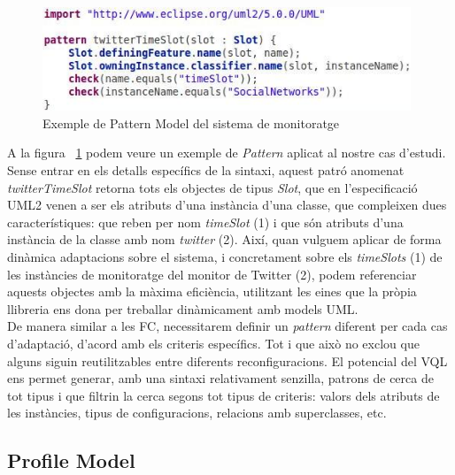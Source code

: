 \begin{figure}
\centering
\includegraphics[width=11cm]{Figures/Figure19}
\decoRule
\caption{Exemple de Pattern Model del sistema de monitoratge}
\label{fig:Figura19}
\end{figure}

A la figura ~\ref{fig:Figura19} podem veure un exemple de \textit{Pattern} aplicat al nostre cas d'estudi. Sense entrar en els detalls específics de la sintaxi, aquest patró anomenat \textit{twitterTimeSlot} retorna tots els objectes de tipus \textit{Slot}, que en l'especificació UML2 venen a ser els atributs d'una instància d'una classe, que compleixen dues característiques: que reben per nom \textit{timeSlot} (1) i que són atributs d'una instància de la classe amb nom \textit{twitter} (2). Així, quan vulguem aplicar de forma dinàmica adaptacions sobre el sistema, i concretament sobre els \textit{timeSlots} (1) de les instàncies de monitoratge del monitor de Twitter (2), podem referenciar aquests objectes amb la màxima eficiència, utilitzant les eines que la pròpia llibreria ens dona per treballar dinàmicament amb models UML.\\

De manera similar a les FC, necessitarem definir un \textit{pattern} diferent per cada cas d'adaptació, d'acord amb els criteris específics. Tot i que això no exclou que alguns siguin reutilitzables entre diferents reconfiguracions. El potencial del VQL ens permet generar, amb una sintaxi relativament senzilla, patrons de cerca de tot tipus i que filtrin la cerca segons tot tipus de criteris: valors dels atributs de les instàncies, tipus de configuracions, relacions amb superclasses, etc. 
 
\subsection{Profile Model}

